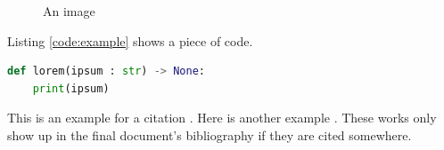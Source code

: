 \documentclass[14pt, bibliography=totoc, index=totoc, listof=totoc]{report}
\begin{document}
\begin{figure}[H]
	\centering
	\vspace{0.4cm}
	\caption{An image}
	\label{fig:example}
	\vspace{-0.4cm}
\end{figure}

Listing \ref{code:example} shows a piece of code.
\begin{lstlisting}[caption=Code example, label=code:example, language=python]
def lorem(ipsum : str) -> None:
    print(ipsum)
\end{lstlisting}

\lipsum[1]
\pagebreak

This is an example for a citation \parencite{typo3-fluid-if-else}. Here is another example \parencite{linux-handbuch}. These works only show up in the final document's bibliography if they are cited somewhere.

\printbibliography[heading=bibintoc, title={References}]
\end{document}

